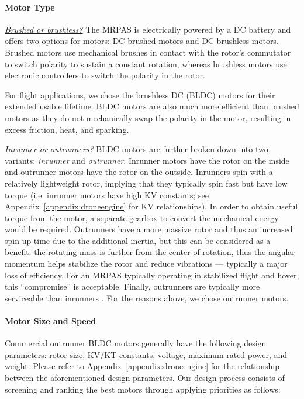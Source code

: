 \paragraph{Motor Type}

\underline{\textit{Brushed or brushless?}}
The MRPAS is electrically powered by a DC battery and offers two options for motors: DC brushed motors and DC brushless motors. Brushed motors use mechanical brushes in contact with the rotor’s commutator to switch polarity to sustain a constant rotation, whereas brushless motors use electronic controllers to switch the polarity in the rotor. 

For flight applications, we chose the brushless DC (BLDC) motors for their extended usable lifetime. BLDC motors are also much more efficient than brushed motors as they do not mechanically swap the polarity in the motor, resulting in excess friction, heat, and  sparking. 

\underline{\textit{Inrunner or outrunners?}}
BLDC motors are further broken down into two variants: \textit{inrunner} and \textit{outrunner}. Inrunner motors have the rotor on the inside and outrunner motors have the rotor on the outside.  Inrunners spin with a relatively lightweight rotor, implying that they typically spin fast but have low torque (i.e. inrunner motors have high KV constants; see Appendix~\ref{appendix:droneengine} for KV relationships). In order to obtain useful torque from the motor, a separate gearbox to convert the mechanical energy would be required\cite{invsoutrunner}. Outrunners have a more massive rotor and thus an increased spin-up time due to the additional inertia, but this can be considered as a benefit: the rotating mass is further from the center of rotation, thus the angular momentum helps stabilize the rotor and reduce vibrations --- typically a major loss of efficiency. For an MRPAS typically operating in stabilized flight and hover, this ``compromise'' is acceptable. Finally, outrunners are typically more serviceable than inrunners \cite{invsoutrunner}. For the reasons above, we chose outrunner motors.

\paragraph{Motor Size and Speed}\label{section:motor-speed}

Commercial outrunner BLDC motors generally have the following design parameters: rotor size, KV/KT constants, voltage, maximum rated power, and weight. Please refer to Appendix~\ref{appendix:droneengine} for the relationship between the aforementioned design parameters. Our design process consists of screening and ranking the best motors through applying priorities as follows:

